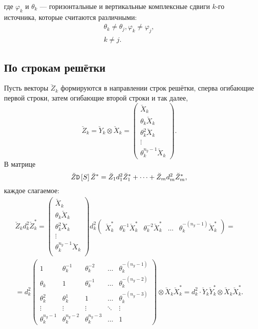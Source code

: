 где $\varphi_k$ и $\theta_k$ --- горизонтальные и вертикальные комплексные сдвиги $k$-го источника, которые считаются различными:
\begin{gather*}
    \theta_k \neq \theta_j , \varphi_k \neq \varphi_j , \\
    k \neq j .
\end{gather*}

\subsection{По строкам решётки}

Пусть векторы $\breve{Z}_k$ формируются в направлении строк решётки, сперва огибающие первой строки, затем огибающие второй строки и так далее,
\[
    \breve{Z}_k
    = \breve{Y}_k \otimes \breve{X}_k
    = \begin{pmatrix}
        \breve{X}_k            \\
        \theta_k \breve{X}_k   \\
        \theta_k^2 \breve{X}_k \\
        \vdots                 \\
        \theta_k^{n_y - 1} \breve{X}_k
    \end{pmatrix} .
\]
В матрице
\[
    \breve{Z} \mathtt{D} \left[ S \right] \breve{Z}^*
    = \breve{Z}_1 d_1^2 \breve{Z}_1^* + \dots + \breve{Z}_m d_m^2 \breve{Z}_m^* ,
\]
каждое слагаемое:
\begin{multline*}
    \breve{Z}_k d_k^2 \breve{Z}_k^*
    = \begin{pmatrix}
        \breve{X}_k                    \\
        \theta_k \breve{X}_k           \\
        \theta_k^2 \breve{X}_k         \\
        \vdots                         \\
        \theta_k^{n_y - 1} \breve{X}_k \\
    \end{pmatrix}
    d_k^2
    \begin{pmatrix}
        \breve{X}_k^* & \theta_k^{-1} \breve{X}_k^* & \theta_k^{-2} \breve{X}_k^* & \dots & \theta_k^{-(n_y - 1)} \breve{X}_k^*
    \end{pmatrix} = \\
    = d_k^2
    \begin{pmatrix}
        1                & \theta_k^{-1}    & \theta_k^{-2}    & \dots  & \theta_k^{-(n_y-1)} \\
        \theta_k         & 1                & \theta_k^{-1}    & \dots  & \theta_k^{-(n_y-2)} \\
        \theta_k^2       & \theta_k^1       & 1                & \dots  & \theta_k^{-(n_y-3)} \\
        \vdots           & \vdots           & \vdots           & \ddots & \vdots              \\
        \theta_k^{n_y-1} & \theta_k^{n_y-2} & \theta_k^{n_y-3} & \dots  & 1
    \end{pmatrix}
    \otimes
    \breve{X}_k \breve{X}_k^*
    =
    d_k^2
    \cdot
    \breve{Y}_k \breve{Y}_k^*
    \otimes
    \breve{X}_k \breve{X}_k^*
    .
\end{multline*}

